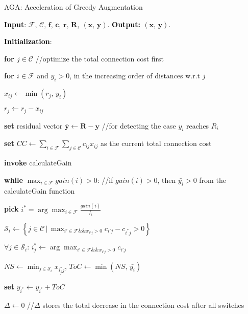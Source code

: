 \documentclass[10pt]{llncs}
\begin{document}
\begin{algorithm}[H]
\caption{AGA: Acceleration of Greedy Augmentation}


\textbf{\textcolor{black}{Input}}\textcolor{black}{: }$\mathcal{F},\,\mathcal{C},\,\boldsymbol{f},\,\boldsymbol{c},\,\boldsymbol{r},\,\boldsymbol{R}$\textcolor{black}{,}\textbf{\textcolor{black}{{}
}}$\left(\boldsymbol{x},\,\boldsymbol{y}\right)$. \textbf{\textcolor{black}{Output:
}}$\left(\boldsymbol{x},\,\boldsymbol{y}\right)$.

\textbf{\textcolor{black}{Initialization}}\textcolor{black}{: }

\textbf{for $j\in\mathcal{C}$ }//optimize the total connection cost
first

\qquad{}\textbf{for $i\in\mathcal{F}$ }and $y_{i}>0$, in the increasing
order of distances w.r.t $j$

\qquad{}\qquad{}$x_{ij}\leftarrow\min\left(r_{j},\, y_{i}\right)$

\qquad{}\qquad{}$r_{j}\leftarrow r_{j}-x_{ij}$

\textbf{set} residual vector $\boldsymbol{\bar{y}}\leftarrow\boldsymbol{R}-\boldsymbol{y}$
//for detecting the case $y_{i}$ reaches $R_{i}$

\textbf{set} $CC\leftarrow\sum_{i\in\mathcal{F}}\sum_{j\in\mathcal{C}}c_{ij}x_{ij}$
as the current total connection cost

\textbf{invoke} calculateGain

\medskip{}


\textbf{while} $\max_{i\in\mathcal{F}}gain\left(i\right)>0$: //if
$ $$gain\left(i\right)>0$, then $\bar{y_{i}}>0$ from the calculateGain
function

\qquad{}\textbf{pick} $i^{*}=\arg\max_{i\in\mathcal{F}}\frac{gain\left(i\right)}{f_{i}}$

\qquad{}$\mathcal{S}_{i}\leftarrow\left\{ j\in\mathcal{\mathcal{\mathcal{C}}}\,|\,\max_{i'\in\mathcal{F}\&\&x_{i'j}>0}c_{i'j}-c_{i^{*}j}>0\right\} $

\qquad{}$\forall j\in\mathcal{S}_{i}:\, i_{j}^{*}\leftarrow\arg\max_{i'\in\mathcal{F}\&\&x_{i'j}>0}c_{i'j}$ 

\qquad{}$NS\leftarrow\min_{j\in\mathcal{S}_{i}}x_{i_{j}^{*}j}$,
$ToC\leftarrow\min\left(NS,\,\bar{y_{i}}\right)$

\qquad{}\textbf{\textcolor{black}{set}} $y_{i^{*}}\leftarrow y_{i^{*}}+ToC$

\qquad{}$\Delta\leftarrow0$ //$\Delta$ stores the total decrease
in the connection cost after all switches


\end{algorithm}
\end{document}
